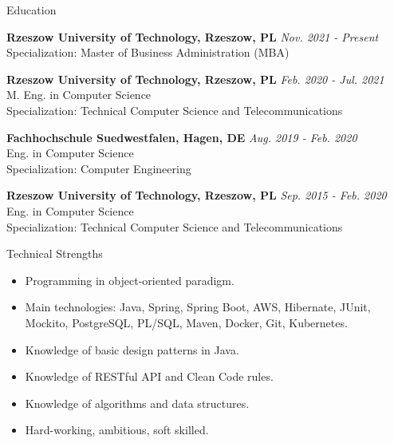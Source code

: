 \documentclass{resume}
\begin{document}
\begin{rSection}{Education}

{\bf Rzeszow University of Technology, Rzeszow, PL} \hfill {\em Nov. 2021 - Present} \\
Specialization: Master of Business Administration (MBA)

{\bf Rzeszow University of Technology, Rzeszow, PL} \hfill {\em Feb. 2020 - Jul. 2021} \\
M. Eng. in Computer Science \\
Specialization: Technical Computer Science and Telecommunications

{\bf Fachhochschule Suedwestfalen, Hagen, DE} \hfill {\em Aug. 2019 - Feb. 2020} \\
Eng. in Computer Science \\
Specialization: Computer Engineering

{\bf Rzeszow University of Technology, Rzeszow, PL} \hfill {\em Sep. 2015 - Feb. 2020} \\
Eng. in Computer Science \\
Specialization: Technical Computer Science and Telecommunications

\end{rSection}

\begin{rSection}{Technical Strengths}

\begin{itemize}
    \item Programming in object-oriented paradigm.
    \item Main technologies: Java, Spring, Spring Boot, AWS, Hibernate, JUnit, Mockito, PostgreSQL, PL/SQL, Maven, Docker, Git, Kubernetes.
    \item Knowledge of basic design patterns in Java.
    \item Knowledge of RESTful API and Clean Code rules.
    \item Knowledge of algorithms and data structures.
    \item Hard-working, ambitious, soft skilled.
\end{itemize}

\end{rSection}
\end{document}
